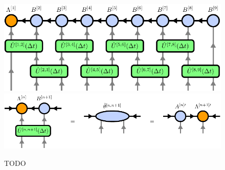 \begin{figure}
	\centering
	\subcaptionbox{\label{fig:mps_tebd_first_order_overview}}
	{%
		\includegraphics[scale=1]{figures/tikz/Tensor_Networks/mps_TEBD/mps_TEBD_a.pdf}
	}
	\subcaptionbox{\label{fig:mps_tebd_first_order_applying_bond_op}}
	{%
		\includegraphics[scale=1]{figures/tikz/Tensor_Networks/mps_TEBD/mps_TEBD_b.pdf}
	}
	\caption{TODO}
	\label{fig:mps_tebd_first_order}
\end{figure}